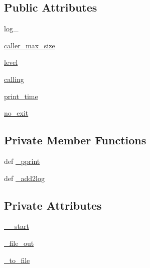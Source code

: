\subsection*{Public Attributes}
\begin{DoxyCompactItemize}
\item 
\hyperlink{classpyneb_1_1utils_1_1logging_1_1my__logging_a4bda17b594629b5490207080dbcb3bbd}{log\-\_\-}
\item 
\hyperlink{classpyneb_1_1utils_1_1logging_1_1my__logging_a0449825f771bc794da88ba49666726d5}{caller\-\_\-max\-\_\-size}
\item 
\hyperlink{classpyneb_1_1utils_1_1logging_1_1my__logging_aa70215328c3f7a97a607c584026e144a}{level}
\item 
\hyperlink{classpyneb_1_1utils_1_1logging_1_1my__logging_a38735db2b351731f0fb79d4a0eb231ab}{calling}
\item 
\hyperlink{classpyneb_1_1utils_1_1logging_1_1my__logging_aba4514cb95d832e8abf7f31f77c27606}{print\-\_\-time}
\item 
\hyperlink{classpyneb_1_1utils_1_1logging_1_1my__logging_aa84eff388fc826a600e063d8cf7c4f63}{no\-\_\-exit}
\end{DoxyCompactItemize}
\subsection*{Private Member Functions}
\begin{DoxyCompactItemize}
\item 
def \hyperlink{classpyneb_1_1utils_1_1logging_1_1my__logging_a8f54e897998e958e5e211eb11fa02c4a}{\-\_\-pprint}
\item 
def \hyperlink{classpyneb_1_1utils_1_1logging_1_1my__logging_a8de4d2383bfa53411876a066e1bf72de}{\-\_\-add2log}
\end{DoxyCompactItemize}
\subsection*{Private Attributes}
\begin{DoxyCompactItemize}
\item 
\hyperlink{classpyneb_1_1utils_1_1logging_1_1my__logging_af75641557adadbef4e010a5c0b9f9513}{\-\_\-\-\_\-start}
\item 
\hyperlink{classpyneb_1_1utils_1_1logging_1_1my__logging_ac22b310e16b6f3a4790ac7658b2c0284}{\-\_\-file\-\_\-out}
\item 
\hyperlink{classpyneb_1_1utils_1_1logging_1_1my__logging_a6fd66745606a3cc0477edafcfdd24fe2}{\-\_\-to\-\_\-file}
\end{DoxyCompactItemize}


